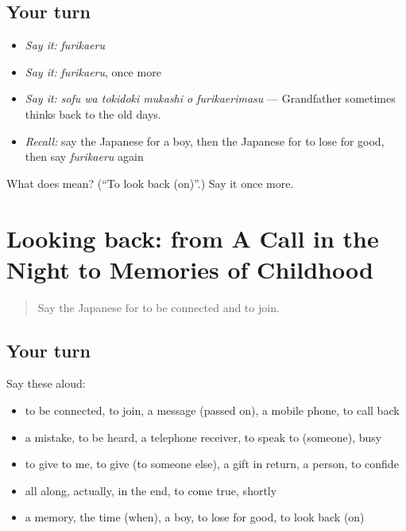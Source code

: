\subsection*{Your turn}
\begin{itemize}
\raggedright
  \item \emph{Say it:} \emph{furikaeru}
  \item \emph{Say it:} \emph{furikaeru}, once more
  \item \emph{Say it:} \emph{sofu wa tokidoki mukashi o furikaerimasu} — Grandfather sometimes thinks back to the old days.
  \item \emph{Recall:} say the Japanese for a boy, then the Japanese for to lose for good, then say \emph{furikaeru} again
\end{itemize}

\begin{tcolorbox}[breakable,colback=teal!4,colframe=teal!35!black,title={Before you move on}]
What does  mean? (\textquotedblleft{}To look back (on)\textquotedblright{}.) Say it once more.
\end{tcolorbox}
\section[(dialogue)]{Looking back: from A Call in the Night to Memories of Childhood}

\label{lesson:JA-R311-review-307-311}



\begin{quote}
Say the Japanese for to be connected and to join.
\end{quote}

\subsection*{Your turn}
Say these aloud:

\begin{itemize}
\raggedright
  \item to be connected, to join, a message (passed on), a mobile phone, to call back
  \item a mistake, to be heard, a telephone receiver, to speak to (someone), busy
  \item to give to me, to give (to someone else), a gift in return, a person, to confide
  \item all along, actually, in the end, to come true, shortly
  \item a memory, the time (when), a boy, to lose for good, to look back (on)
\end{itemize}

